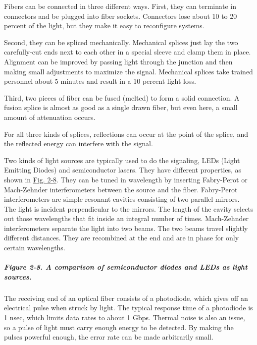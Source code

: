 \documentclass[b5paper,11pt]{memoir}
\begin{document}
Fibers can be connected in three different ways. First, they can
terminate in connectors and be plugged into fiber sockets. Connectors
lose about 10 to 20 percent of the light, but they make it easy to
reconfigure systems.

Second, they can be spliced mechanically. Mechanical splices just lay
the two carefully-cut ends next to each other in a special sleeve and
clamp them in place. Alignment can be improved by passing light through
the junction and then making small adjustments to maximize the signal.
Mechanical splices take trained personnel about 5 minutes and result in
a 10 percent light loss.

Third, two pieces of fiber can be fused (melted) to form a solid
connection. A fusion splice is almost as good as a single drawn fiber,
but even here, a small amount of attenuation occurs.

For all three kinds of splices, reflections can occur at the point of
the splice, and the reflected energy can interfere with the signal.

Two kinds of light sources are typically used to do the signaling, LEDs
(Light Emitting Diodes) and semiconductor lasers. They have different
properties, as shown in
\protect\hyperlink{0130661023_ch02lev1sec2.htmlux5cux23ch02fig08}{Fig.
2-8}. They can be tuned in wavelength by inserting Fabry-Perot or
Mach-Zehnder interferometers between the source and the fiber.
Fabry-Perot interferometers are simple resonant cavities consisting of
two parallel mirrors. The light is incident perpendicular to the
mirrors. The length of the cavity selects out those wavelengths that fit
inside an integral number of times. Mach-Zehnder interferometers
separate the light into two beams. The two beams travel slightly
different distances. They are recombined at the end and are in phase for
only certain wavelengths.

\subparagraph[Figure 2-8. A comparison of semiconductor diodes and LEDs
as light
sources.]{\texorpdfstring{\protect\hypertarget{0130661023_ch02lev1sec2.htmlux5cux23ch02fig08}{}{}Figure
2-8. A comparison of semiconductor diodes and LEDs as light
sources.}{Figure 2-8. A comparison of semiconductor diodes and LEDs as light sources.}}


The receiving end of an optical fiber consists of a photodiode, which
gives off an electrical pulse when struck by light. The typical response
time of a photodiode is 1 nsec, which limits data rates to about 1 Gbps.
Thermal noise is also an issue, so a pulse of light must carry enough
energy to be detected. By making the pulses powerful enough, the error
rate can be made arbitrarily small.
\end{document}
